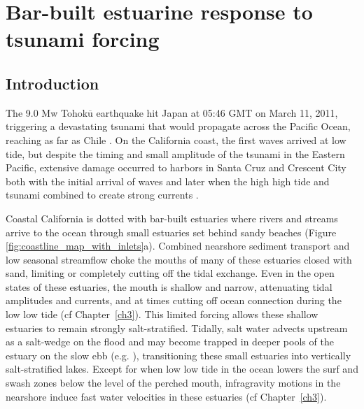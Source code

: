 \chapter{Bar-built estuarine response to tsunami forcing}
\label{chTsunami}




\section{Introduction}

The 9.0 Mw Tohok$\overline{\mathrm{u}}$ earthquake hit Japan at 05:46 GMT on March 11, 2011,
triggering a devastating tsunami that would propagate across the Pacific
Ocean, reaching as far as Chile \parencite{mori_survey_2011,lagos_magnitude_2011}. On the California coast, the first waves arrived at low tide, but despite the timing and small amplitude of the tsunami in the Eastern Pacific,
extensive damage occurred to harbors in Santa Cruz and Crescent City
both with the initial arrival of waves and later when the high high
tide and tsunami combined to create strong currents \parencite{wilson_observations_2012}.

Coastal California is dotted with bar-built estuaries where rivers
and streams arrive to the ocean through small estuaries set behind
sandy beaches (Figure \ref{fig:coastline_map_with_inlets}a). Combined
nearshore sediment transport and low seasonal streamflow choke the
mouths of many of these estuaries closed with sand, limiting or completely
cutting off the tidal exchange. Even in the open states of these estuaries,
the mouth is shallow and narrow, attenuating tidal amplitudes and
currents, and at times cutting off ocean connection during the low low
tide (cf Chapter~\ref{ch3}). This limited forcing allows
these shallow estuaries to remain strongly salt-stratified. Tidally,
salt water advects upstream as a salt-wedge on the flood and may become
trapped in deeper pools of the estuary on the slow ebb (e.g. \cite{largier_dynamics_1991,ranasinghe_circulation_1999}),
transitioning these small estuaries into vertically salt-stratified
lakes. Except for when low low tide in the ocean lowers the surf and
swash zones below the level of the perched mouth, infragravity motions
in the nearshore induce fast water velocities in these estuaries (cf Chapter~\ref{ch3}). 



